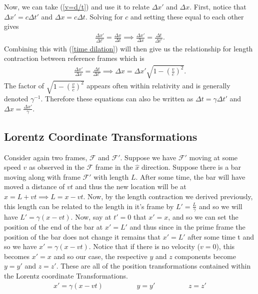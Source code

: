 Now, we can take (\ref{v=d/t}) and use it to relate $\Delta x'$ and $\Delta x$. First, notice that $\Delta x' = c \Delta t'$ and $\Delta x = c \Delta t$. Solving for $c$ and setting these equal to each other gives \begin{align}
	\frac{\Delta x'}{\Delta t'} = \frac{\Delta x}{\Delta t} \implies \frac{\Delta x'}{\Delta x} = \frac{\Delta t}{\Delta t'} \label{Delta x'/Delta t' = Delta x/Delta t}.
\end{align} 
Combining this with (\ref{time dilation}) will then give us the relationship for length contraction between reference frames which is
\begin{align}
	\frac{\Delta x'}{\Delta x} = \frac{\Delta t}{\Delta t'} \implies \Delta x = \boxed{\Delta x' \sqrt{1-\left(\frac{v}{c}\right)^2}}. \label{lengthContraction}
\end{align}
The factor of $\sqrt{1-\left(\frac{v}{c}\right)^2}$ appears often within relativity and is generally denoted $\gamma^{-1}$. Therefore these equations can also be written as $\Delta t=\gamma \Delta t'$ and $\Delta x=\frac{ \Delta x'}{\gamma}$. 

\subsection{Lorentz Coordinate Transformations}

Consider again two frames, $\mathcal{F}$ and $\mathcal{F}'$. Suppose we have $\mathcal{F}'$ moving at some speed $v$ as observed in the $\mathcal{F}$ frame in the $\hat{x}$ direction. Suppose there is a bar moving along with frame $\mathcal{F}'$ with length $L$. After some time, the bar will have moved a distance of $vt$ and thus the new location will be at $x=L+vt \implies L=x-vt$. Now, by the length contraction we derived previously, this length can be related to the length in it's frame by $L'= \frac{L}{\gamma}$ and so we will have $L'=\gamma(x-vt)$. Now, say at $t'=0$ that $x'=x$, and so we can set the position of the end of the bar at $x'=L'$ and thus since in the prime frame the position of the bar does not change it remains that $x'=L'$ after some time t and so we have $x'=\gamma (x-vt)$. Notice that if there is no velocity ($v=0$), this becomes $x'=x$ and so our case, the respective $y$ and $z$ components become $y=y'$ and $z=z'$. These are all of the position transformations contained within the Lorentz coordinate Transformations. 
\begin{align}
	\boxed{x'=\gamma (x-vt) \hspace{2cm} y=y' \hspace{2cm} z=z'} \label{Lorentz Space}
\end{align}

